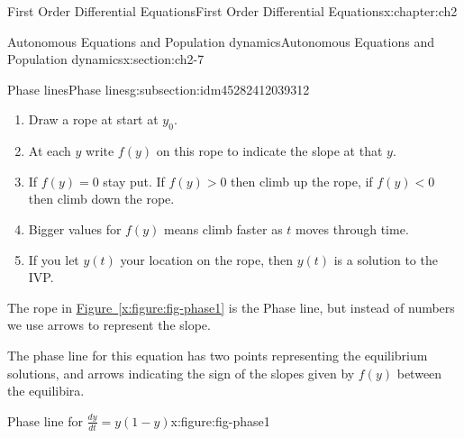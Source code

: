 \documentclass[oneside,10pt,]{book}
\numberwithin{equation}{section}
\numberwithin{equation}{section}
\newcommand{\lt}{<}
\begin{document}
\begin{chapterptx}{First Order Differential Equations}{}{First Order Differential Equations}{}{}{x:chapter:ch2}
\begin{sectionptx}{Autonomous Equations and Population dynamics}{}{Autonomous Equations and Population dynamics}{}{}{x:section:ch2-7}
\begin{subsectionptx}{Phase lines}{}{Phase lines}{}{}{g:subsection:idm45282412039312}
\begin{enumerate}
\item{}Draw a rope at start at \(y_{0}\).%
\item{}At each \(y\) write \(f(y)\) on this rope to indicate the slope at that \(y\).%
\item{}If \(f(y)=0\) stay put. If \(f(y)>0\) then climb up the rope, if \(f(y)\lt 0\) then climb down the rope.%
\item{}Bigger values for \(f(y)\) means climb faster as \(t\) moves through time.%
\item{}If you let \(y(t)\) your location on the rope, then \(y(t)\) is a solution to the IVP.%
\end{enumerate}
%
\par
The rope in \hyperref[x:figure:fig-phase1]{Figure~\ref{x:figure:fig-phase1}} is the Phase line, but instead of numbers we use arrows to represent the slope.%
\par
The phase line for this equation has two points representing the equilibrium solutions, and arrows indicating the sign of the slopes given by \(f(y)\) between the equilibira.%
\begin{figureptx}{Phase line for \(\frac{dy}{dt} = y(1-y)\)}{x:figure:fig-phase1}{}%
\begin{image}{0.35}{0.3}{0.35}%

\end{image}
\end{figureptx}
\end{subsectionptx}
\end{sectionptx}
\end{chapterptx}
\end{document}
